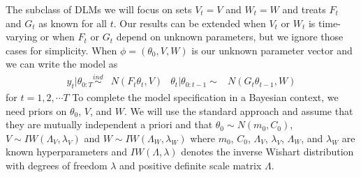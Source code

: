 \documentclass{article}
\begin{document}
The subclass of DLMs we will focus on sets $V_t=V$ and $W_t=W$ and treats $F_{t}$ and $G_{t}$ as known for all $t$. Our results can be extended when $V_t$ or $W_t$ is time-varying or when $F_t$ or $G_t$ depend on unknown parameters, but we ignore those cases for simplicity. When $\phi=(\theta_0,V,W)$ is our unknown parameter vector and we can write the model as
\begin{align}
  y_t|\theta_{0:T} \stackrel{ind}{\sim} & N(F_t\theta_t,V) &
  \theta_t|\theta_{0:t-1}  \sim & N(G_t\theta_{t-1},W) \label{dlmbotheqs}
\end{align}
for $t=1,2,\cdots T$ To complete the model specification in a Bayesian context, we need priors on $\theta_0$, $V$, and $W$. We will use the standard approach and assume that they are mutually independent a priori and that $\theta_0 \sim N(m_0, C_0)$, $V \sim IW(\Lambda_V, \lambda_V)$ and $W \sim IW(\Lambda_W, \lambda_W)$ where $m_0$, $C_0$, $\Lambda_V$, $\lambda_V$, $\Lambda_W$, and $\lambda_W$ are known hyperparameters and $IW(\Lambda, \lambda)$ denotes the inverse Wishart distribution with degrees of freedom $\lambda$ and positive definite scale matrix $\Lambda$.
\end{document}
